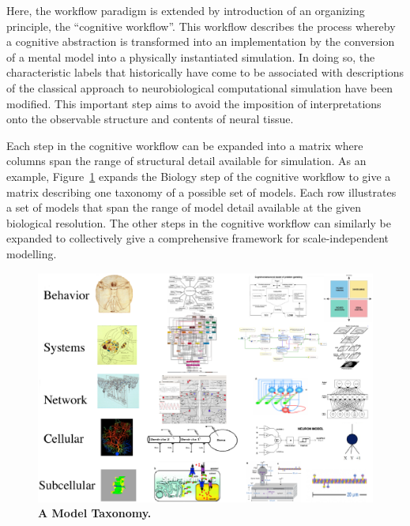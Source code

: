 \documentclass{article}
\begin{document}
Here, the workflow paradigm is extended by introduction of an organizing principle, the “cognitive workflow”. This workflow describes the process whereby a cognitive abstraction is transformed into an implementation by the conversion of a mental model into a physically instantiated simulation. In doing so, the characteristic labels that historically have come to be associated with descriptions of the classical approach to neurobiological computational simulation have been modified. This important step aims to avoid the imposition of interpretations onto the observable structure and contents of neural tissue.

Each step in the cognitive workflow can be expanded into a matrix where columns span the range of structural detail available for simulation.  As an example, Figure~\ref{fig:multi-scale-taxonomy} expands the Biology step of the cognitive workflow to give a matrix describing one taxonomy of a possible set of models.  Each row illustrates a set of models that span the range of model detail available at the given biological resolution.  The other steps in the cognitive workflow can similarly be expanded to collectively give a comprehensive framework for scale-independent modelling. 

\begin{figure}[h!t]
  \begin{center}
    \includegraphics[width=4.5in]{figures/multi-scale-taxonomy-no-arrows-no-texts.eps}
  \end{center}
  \caption{ {\bf A Model Taxonomy.} }
  \label{fig:multi-scale-taxonomy}
\end{figure}
\end{document}
